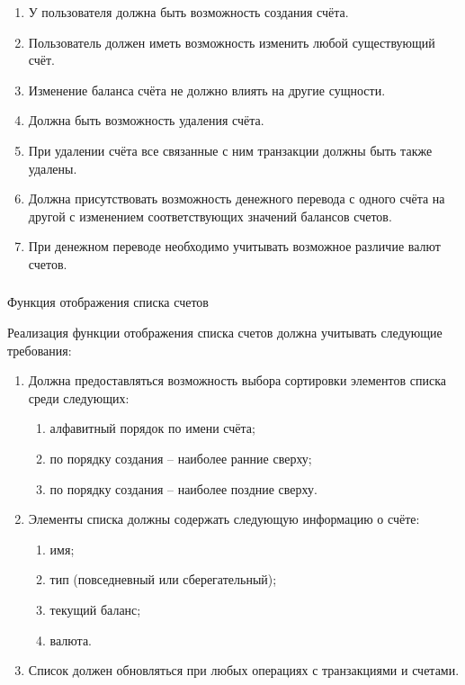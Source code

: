 \begin{enumerate}
    \item У пользователя должна быть возможность создания счёта.
    \item Пользователь должен иметь возможность изменить любой существующий счёт.
    \item Изменение баланса счёта не должно влиять на другие сущности.
    \item Должна быть возможность удаления счёта.
    \item При удалении счёта все связанные с ним транзакции должны быть также удалены.
    \item Должна присутствовать возможность денежного перевода с одного счёта на другой с изменением соответствующих значений балансов счетов.
    \item При денежном переводе необходимо учитывать возможное различие валют счетов.
\end{enumerate}

\subsubsection{} Функция отображения списка счетов
\label{sec:domain:specification:wallets_list}

Реализация функции отображения списка счетов должна учитывать следующие требования:

\begin{enumerate}
    \item Должна предоставляться возможность выбора сортировки элементов списка среди следующих:
    \begin{enumerate}
        \item алфавитный порядок по имени счёта;
        \item по порядку создания -- наиболее ранние сверху;
        \item по порядку создания -- наиболее поздние сверху.
    \end{enumerate}
    \item Элементы списка должны содержать следующую информацию о счёте:
    \begin{enumerate}
        \item имя;
        \item тип (повседневный или сберегательный);
        \item текущий баланс;
        \item валюта.
    \end{enumerate}
    \item Список должен обновляться при любых операциях с транзакциями и счетами.
\end{enumerate}


